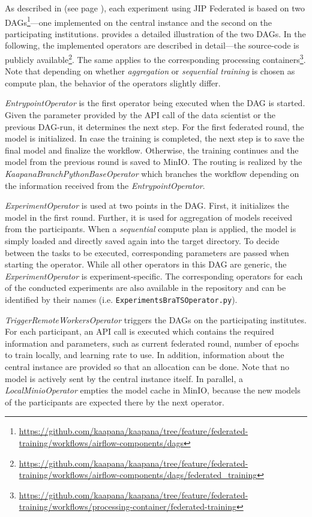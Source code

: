 As described in  (see page \pageref{subsec:MethodsJIPFederated}), each experiment using JIP Federated is based on two DAGs\footnote{\url{https://github.com/kaapana/kaapana/tree/feature/federated-training/workflows/airflow-components/dags}}---one implemented on the central instance and the second on the participating institutions.  provides a detailed illustration of the two DAGs.
In the following, the implemented operators are described in detail---the source-code is publicly available\footnote{\url{https://github.com/kaapana/kaapana/tree/feature/federated-training/workflows/airflow-components/dags/federated_training}}.
The same applies to the corresponding processing containers\footnote{\url{https://github.com/kaapana/kaapana/tree/feature/federated-training/workflows/processing-container/federated-training}}.
Note that depending on whether \textit{aggregation} or \textit{sequential training} is chosen as compute plan, the behavior of the operators slightly differ.

\textit{EntrypointOperator} is the first operator being executed when the DAG is started. Given the parameter provided by the API call of the data scientist or the previous DAG-run, it determines the next step. 
For the first federated round, the model is initialized. In case the training is completed, the next step is to save the final model and finalize the workflow.
Otherwise, the training continues and the model from the previous round is saved to MinIO.
The routing is realized by the \textit{KaapanaBranchPythonBaseOperator} which branches the workflow depending on the information received from the \textit{EntrypointOperator}.

\textit{ExperimentOperator} is used at two points in the DAG. First, it initializes the model in the first round. Further, it is used for aggregation of models received from the participants. When a \textit{sequential} compute plan is applied, the model is simply loaded and directly saved again into the target directory.
To decide between the tasks to be executed, corresponding parameters are passed when starting the operator.
While all other operators in this DAG are generic, the \textit{ExperimentOperator} is experiment-specific. The corresponding operators for each of the conducted experiments are also available in the repository and can be identified by their names (i.e. \verb|ExperimentsBraTSOperator.py|).

\textit{TriggerRemoteWorkersOperator} triggers the DAGs on the participating institutes. For each participant, an API call is executed which contains the required information and parameters, such as current federated round, number of epochs to train locally, and learning rate to use. In addition, information about the central instance are provided so that an allocation can be done. Note that no model is actively sent by the central instance itself.
In parallel, a \textit{LocalMinioOperator} empties the model cache in MinIO, because the new models of the participants are expected there by the next operator.

